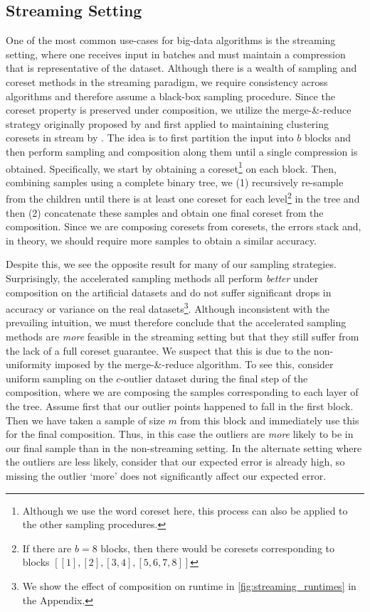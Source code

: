 \subsection{Streaming Setting}
\label{ssec:streaming}

One of the most common use-cases for big-data algorithms is the streaming setting, where one receives input in batches and must maintain a compression that is
representative of the dataset. Although there is a wealth of sampling and coreset methods in the streaming paradigm, we require consistency
across algorithms and therefore assume a black-box sampling procedure. Since the coreset property is preserved under composition, we utilize the merge-\&-reduce
strategy originally proposed by \cite{BS80} and first applied to maintaining clustering coresets in stream by \cite{HaM01}. The idea is to first partition the
input into $b$ blocks and then perform sampling and composition along them until a single compression is obtained. Specifically, we start by obtaining
a coreset\footnote{Although we use the word coreset here, this process can also be applied to the other sampling procedures.} on each block. Then, combining
samples using a complete binary tree, we (1) recursively re-sample from the children until there is at least one coreset for each level\footnote{If there are
$b=8$ blocks, then there would be coresets corresponding to blocks $[[1], [2], [3, 4], [5, 6, 7, 8]]$} in the tree and then (2) concatenate these samples and
obtain one final coreset from the composition. Since we are composing coresets from coresets, the errors stack and, in theory, we should require more samples
to obtain a similar accuracy.

Despite this, we see the opposite result for many of our sampling strategies. Surprisingly, the accelerated sampling methods all perform \emph{better} under
composition on the artificial datasets and do not suffer significant drops in accuracy or variance on the real datasets\footnote{We show the effect of
composition on runtime in \ref{fig:streaming_runtimes} in the Appendix.}. Although inconsistent with the prevailing intuition, we must therefore conclude that
the accelerated sampling methods are \emph{more} feasible in the streaming setting but that they still suffer from the lack of a full coreset guarantee.  We
suspect that this is due to the non-uniformity imposed by the merge-\&-reduce algorithm. To see this, consider uniform sampling on the $c$-outlier dataset
during the final step of the composition, where we are composing the samples corresponding to each layer of the tree. Assume first that our outlier points
happened to fall in the first block. Then we have taken a sample of size $m$ from this block and immediately use this for the final composition. Thus, in this
case the outliers are \emph{more} likely to be in our final sample than in the non-streaming setting. In the alternate setting where the outliers are less
likely, consider that our expected error is already high, so missing the outlier `more' does not significantly affect our expected error. 
